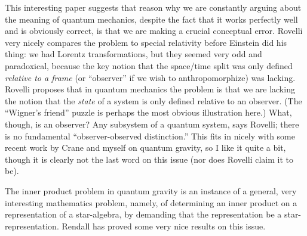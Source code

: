 \documentclass{article}
\def\tightlist{}
\renewcommand{\texttt}[1]{%
  \begingroup
  \ttfamily
  \begingroup\lccode`~=`/\lowercase{\endgroup\def~}{/\discretionary{}{}{}}%
  \begingroup\lccode`~=`[\lowercase{\endgroup\def~}{[\discretionary{}{}{}}%
  \begingroup\lccode`~=`.\lowercase{\endgroup\def~}{.\discretionary{}{}{}}%
  \catcode`/=\active\catcode`[=\active\catcode`.=\active
  \scantokens{#1\noexpand}%
  \endgroup
}
\begin{document}
\noindent
This interesting paper suggests that reason why we are constantly
arguing about the meaning of quantum mechanics, despite the fact that it
works perfectly well and is obviously correct, is that we are making a
crucial conceptual error. Rovelli very nicely compares the problem to
special relativity before Einstein did his thing: we had Lorentz
transformations, but they seemed very odd and paradoxical, because the
key notion that the space/time split was only defined \emph{relative to
a frame} (or ``observer'' if we wish to anthropomorphize) was lacking.
Rovelli proposes that in quantum mechanics the problem is that we are
lacking the notion that the \emph{state} of a system is only defined
relative to an observer. (The ``Wigner's friend'' puzzle is perhaps the
most obvious illustration here.) What, though, is an observer? Any
subsystem of a quantum system, says Rovelli; there is no fundamental
``observer-observed distinction.'' This fits in nicely with some recent
work by Crane and myself on quantum gravity, so I like it quite a bit,
though it is clearly not the last word on this issue (nor does Rovelli
claim it to be).

\noindent
The inner product problem in quantum gravity is an instance of a
general, very interesting mathematics problem, namely, of determining an
inner product on a representation of a star-algebra, by demanding that
the representation be a star-representation. Rendall has proved some
very nice results on this issue.

\end{document}
